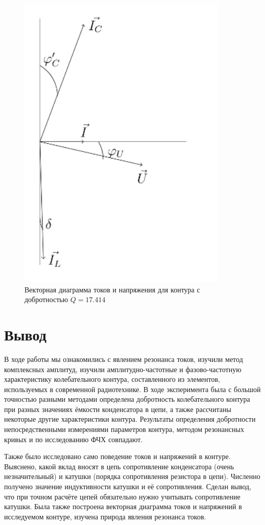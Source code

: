\documentclass[a4paper]{article}
\begin{document}
\begin{enumerate}
          \begin{figure}[H]
              \centering
              \includegraphics[width=10cm]{Screenshot from 2023-10-11 14-58-30.png}
              \caption{Векторная диаграмма токов и напряжения для контура с добротностью $Q = 17.414$}
              \label{fig:vac}
          \end{figure}

\end{enumerate}

\section{Вывод}
В ходе работы мы ознакомились с явлением резонанса токов, изучили метод комплексных амплитуд, изучили амплитудно-частотные и фазово-частотную характеристику колебательного контура, составленного из элементов, используемых в современной радиотехнике. В ходе эксперимента была с большой точностью разными методами определена добротность колебательного контура при разных значениях ёмкости конденсатора в цепи, а также рассчитаны некоторые другие характеристики контура. Результаты определения добротности непосредственными измерениями параметров контура, методом резонансных кривых и по исследованию ФЧХ совпадают. \par
Также было исследовано само поведение токов и напряжений в контуре. Выяснено, какой вклад вносят в цепь сопротивление конденсатора (очень незначительный) и катушки (порядка сопротивления резистора в цепи). Численно получено значение индуктивности катушки и её сопротивления. Сделан вывод, что при точном расчёте цепей обязательно нужно учитывать сопротивление катушки. Была также построена векторная диаграмма токов и напряжений в исследуемом контуре, изучена природа явления резонанса токов.
\end{document}
